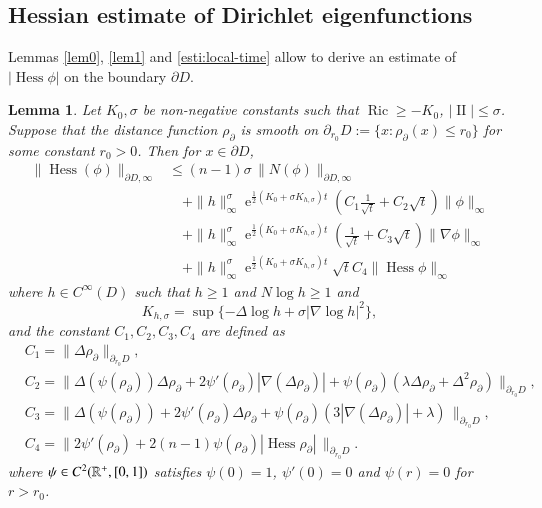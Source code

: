 \documentclass[11pt,reqno]{amsart}
\newtheorem{lemma}[theorem]{Lemma}
\theoremstyle{definition} \newtheorem{remark}[theorem]{Remark}
\numberwithin{equation}{section}
\def\Ric{{\operatorname{Ric}}} \def\Hess{\operatorname{Hess}}
\newcommand\1{\mathbbm{1}}
\def\Ric{{\operatorname{Ric}}} \def\Aut{{\operatorname{Aut}}}
\def\r{\right}
\def\l{\left} \def\e{\operatorname{e}} \def\dsum{\displaystyle\sum}
\def\II{{\operatorname{II}}}
\begin{document}
\subsection{Hessian estimate of Dirichlet eigenfunctions}

Lemmas \ref{lem0}, \ref{lem1} and \ref{esti:local-time} allow to derive an estimate of $|\Hess \phi|$ on the boundary
$\partial D$.

\begin{lemma}\label{lem3}
 Let $K_0, \sigma $ be non-negative constants such that  $\Ric\geq -K_0$, $|\II|\leq \sigma$. Suppose that
  the distance function  $\rho_{\partial}$ is  smooth on $\partial_{r_0}D:=\{x: \rho_{\partial }(x)\leq r_0\}$ for some constant $r_0>0$. 
  Then for $x\in \partial D$,
  \begin{align*}
   \big\|\Hess(\phi)\big\|_{\partial D,\infty} &\leq 
  (n-1)\sigma \,\|N(\phi)\|_{\partial D, \infty}\\
                                               &\quad+\|h\|_{\infty}^{\sigma}\e^{\frac{1}{2}(K_0+\sigma K_{h,\sigma})t}\l(C_1\frac{1}{\sqrt{t}}+C_2\sqrt{t}\r)\|\phi\|_{\infty}\\
 &\quad+  \|h\|_{\infty}^{\sigma}\e^{\frac{1}{2}(K_0+\sigma K_{h,\sigma})t}\l(\frac{1}{\sqrt{t}}+C_3\sqrt{t}\r)\|\nabla \phi\|_{\infty}\\
 &\quad +\|h\|_{\infty}^{\sigma}\e^{\frac{1}{2}(K_0+\sigma K_{h,\sigma})t}\sqrt{t}C_4\|\Hess \phi\|_{\infty}
  \end{align*}
  where $h\in C^{\infty}(D)$ such that $h\geq 1$ and $N\log h \geq 1$ and
$$K_{h,\sigma}=\sup\{-\Delta\log h+\sigma |\nabla \log h|^2\},$$
and the  constant $C_1,C_2, C_3, C_4$ are defined as
\begin{align*}
&C_1= \|\Delta \rho_{\partial} \|_{\partial_{r_0}D}, \\
& C_2 = \| \Delta (\psi (\rho_{\partial}))  \Delta \rho_{\partial}+2 \psi'(\rho_{\partial})|\nabla(\Delta \rho_{\partial})|+\psi(\rho_{\partial})(\lambda \Delta \rho_{\partial}+\Delta^2 \rho_{\partial})\|_{\partial_{r_0}D},\\
&C_3=\|\Delta (\psi (\rho_{\partial}))+2 \psi'(\rho_{\partial}) \Delta \rho_{\partial} +\psi(\rho_{\partial}) (3|\nabla(\Delta \rho_{\partial})|+\lambda)\,\|_{\partial_{r_0}D},\\
&C_4= \|2\psi'(\rho_{\partial})+2(n-1)\psi(\rho_{\partial})|\Hess \rho_{\partial}|\,\|_{\partial_{r_0}D}.
 \end{align*}
 where $\psi\in C^2(\mathbb{R}^+, [0,1])$ satisfies $\psi(0)=1$, $\psi'(0)=0$ and $\psi(r)=0$ for $r>r_0$.
\end{lemma}
\end{document}
